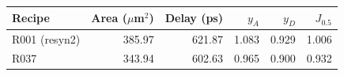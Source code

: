 \begin{tabular}{@{}lrrrrr@{}}
\toprule
\textbf{Recipe} & \textbf{Area ($\mu$m$^2$)} & \textbf{Delay (ps)} & \textbf{$y_A$} & \textbf{$y_D$} & \textbf{$J_{0.5}$} \\
\midrule
R001 (resyn2) & 385.97 & 621.87 & 1.083 & 0.929 & 1.006 \\
R037 & 343.94 & 602.63 & 0.965 & 0.900 & 0.932 \\
\bottomrule
\end{tabular}
